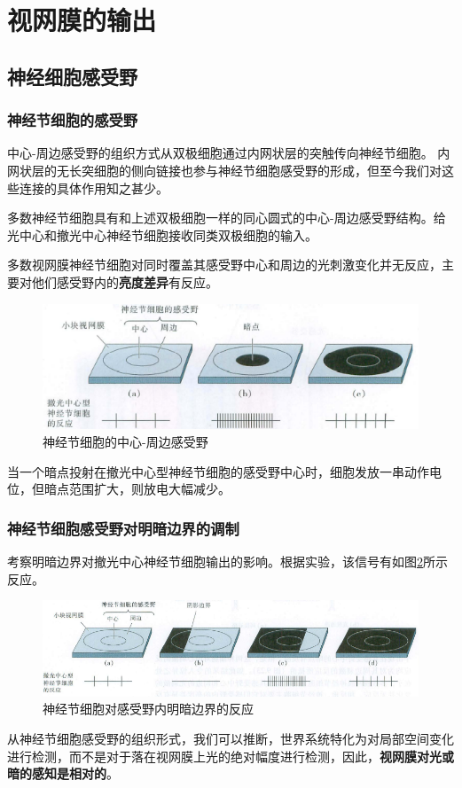 \section{视网膜的输出}

\subsection{神经细胞感受野}
\begin{frame}
    \frametitle{神经节细胞的感受野}
            中心-周边感受野的组织方式从双极细胞通过内网状层的突触传向神经节细胞。
            内网状层的无长突细胞的侧向链接也参与神经节细胞感受野的形成，但至今我们对这些连接的具体作用知之甚少。
        
            多数神经节细胞具有和上述双极细胞一样的同心圆式的中心-周边感受野结构。给光中心和撤光中心神经节细胞接收同类双极细胞的输入。
        
            多数视网膜神经节细胞对同时覆盖其感受野中心和周边的光刺激变化并无反应，主要对他们感受野内的\textbf{亮度差异}有反应。        
            \begin{figure}
                \centering
                \includegraphics[width=.8\textwidth]{img/pic7-1.png}
                \caption{神经节细胞的中心-周边感受野\label{pic7-1}}
            \end{figure}
            \tiny{
                当一个暗点投射在撤光中心型神经节细胞的感受野中心时，细胞发放一串动作电位，但暗点范围扩大，则放电大幅减少。
            }
    
\end{frame}

\begin{frame}
    \frametitle{神经节细胞感受野对明暗边界的调制}
    考察明暗边界对撤光中心神经节细胞输出的影响。根据实验，该信号有如图\ref{pic7-2}所示反应。%
    \begin{figure}
        \centering
        \includegraphics[width=.8\textwidth]{img/pic7-2.png}
        \caption{神经节细胞对感受野内明暗边界的反应\label{pic7-2}}
    \end{figure}
    从神经节细胞感受野的组织形式，我们可以推断，世界系统特化为对局部空间变化进行检测，而不是对于落在视网膜上光的绝对幅度进行检测，因此，\textbf{视网膜对光或暗的感知是相对的}。
\end{frame}
